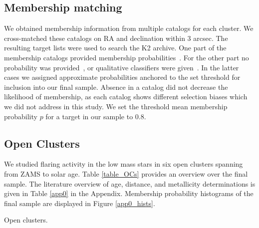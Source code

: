 \documentclass{aa}
\begin{document}
\subsection{Membership matching}
We obtained membership information from multiple catalogs for each cluster. We cross-matched these catalogs on RA and declination within 3 arcsec. The resulting target lists were used to search the K2 archive.%
One part of the membership catalogs provided membership probabilities~\citep{douglas_praesepe_hyades_2014, cantat_gaudin_2018, olivares_pleiades_2018, reino_hyades_2018, gao_m67mem_2018, olivares_ngc6774_2019}. For the other part no probability was provided~\citep{rebull_rotation_2016, douglas_poking_2017, gaia_dr2_2018_hrd}, or qualitative classifiers were given~\citep{curtis_ruprecht_2013, gonzalez_m67mem_2016,rebull_praesepe_2017}. In the latter cases we assigned approximate probabilities anchored to the set threshold for inclusion into our final sample. Absence in a catalog did not decrease the likelihood of membership, as each catalog shows different selection biases which we did not address in this study. We set the threshold mean membership probability $p$ for a target in our sample to 0.8.
\\
\subsection{Open Clusters}
We studied flaring activity in the low mass stars in six open clusters spanning from ZAMS to solar age. Table \ref{table_OCs} provides an overview over the final sample. The literature overview of age, distance, and metallicity determinations is given in Table \ref{app0} in the Appendix. Membership probability histograms of the final sample are displayed in Figure \ref{app0_hists}.
\begin{table}
\caption{Open clusters.}
\label{table_OCs}
\centering

\end{table}
\end{document}
